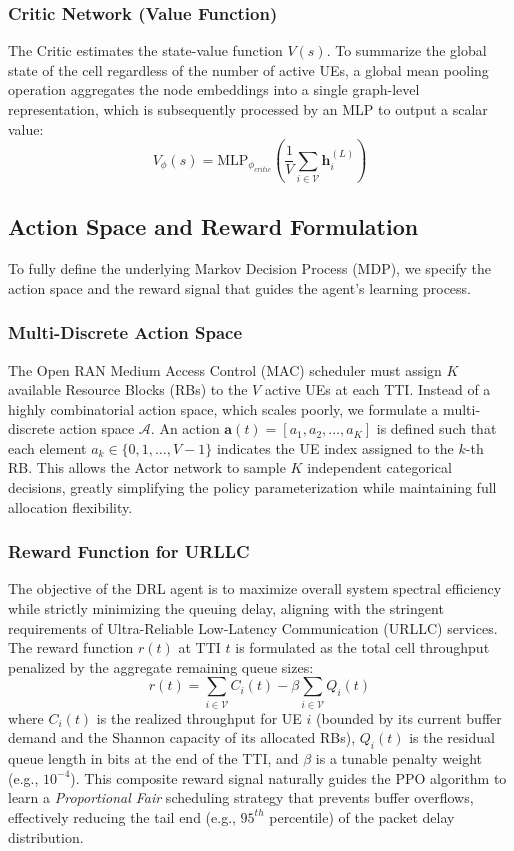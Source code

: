 \subsubsection{Critic Network (Value Function)}
The Critic estimates the state-value function $V(s)$. To summarize the global state of the cell regardless of the number of active UEs, a global mean pooling operation aggregates the node embeddings into a single graph-level representation, which is subsequently processed by an MLP to output a scalar value:
\begin{equation}
    V_\phi(s) = \text{MLP}_{\phi_{critic}} \left( \frac{1}{V} \sum_{i \in \mathcal{V}} \mathbf{h}_i^{(L)} \right)
\end{equation}

\subsection{Action Space and Reward Formulation}
To fully define the underlying Markov Decision Process (MDP), we specify the action space and the reward signal that guides the agent's learning process.

\subsubsection{Multi-Discrete Action Space}
The Open RAN Medium Access Control (MAC) scheduler must assign $K$ available Resource Blocks (RBs) to the $V$ active UEs at each TTI. Instead of a highly combinatorial action space, which scales poorly, we formulate a multi-discrete action space $\mathcal{A}$. An action $\mathbf{a}(t) = [a_1, a_2, \dots, a_K]$ is defined such that each element $a_k \in \{0, 1, \dots, V-1\}$ indicates the UE index assigned to the $k$-th RB. This allows the Actor network to sample $K$ independent categorical decisions, greatly simplifying the policy parameterization while maintaining full allocation flexibility.

\subsubsection{Reward Function for URLLC}
The objective of the DRL agent is to maximize overall system spectral efficiency while strictly minimizing the queuing delay, aligning with the stringent requirements of Ultra-Reliable Low-Latency Communication (URLLC) services. The reward function $r(t)$ at TTI $t$ is formulated as the total cell throughput penalized by the aggregate remaining queue sizes:
\begin{equation}
    r(t) = \sum_{i \in \mathcal{V}} C_i(t) - \beta \sum_{i \in \mathcal{V}} Q_i(t)
\end{equation}
where $C_i(t)$ is the realized throughput for UE $i$ (bounded by its current buffer demand and the Shannon capacity of its allocated RBs), $Q_i(t)$ is the residual queue length in bits at the end of the TTI, and $\beta$ is a tunable penalty weight (e.g., $10^{-4}$). This composite reward signal naturally guides the PPO algorithm to learn a \textit{Proportional Fair} scheduling strategy that prevents buffer overflows, effectively reducing the tail end (e.g., $95^{th}$ percentile) of the packet delay distribution.

